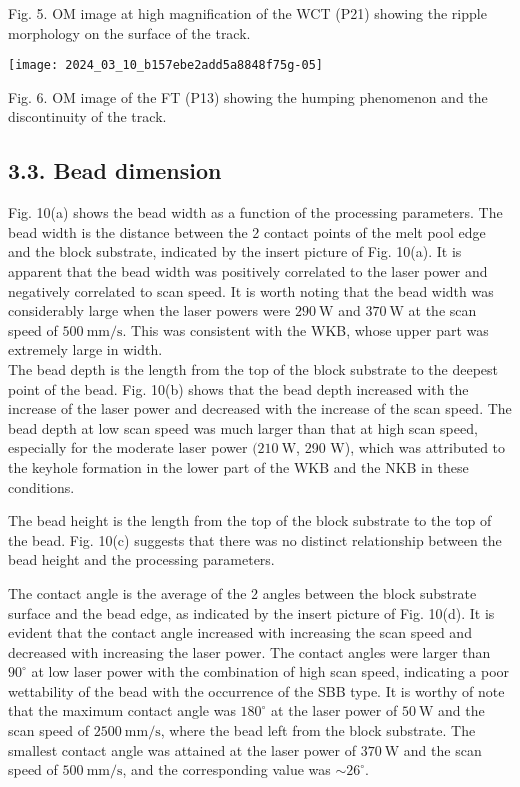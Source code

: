 \documentclass[10pt]{article}
\begin{document}
Fig. 5. OM image at high magnification of the WCT (P21) showing the ripple morphology on the surface of the track.

\begin{center}
\texttt{[image: 2024\_03\_10\_b157ebe2add5a8848f75g-05]}
\end{center}

Fig. 6. OM image of the FT (P13) showing the humping phenomenon and the discontinuity of the track.

\subsection*{3.3. Bead dimension}
Fig. 10(a) shows the bead width as a function of the processing parameters. The bead width is the distance between the 2 contact points of the melt pool edge and the block substrate, indicated by the insert picture of Fig. 10(a). It is apparent that the bead width was positively correlated to the laser power and negatively correlated to scan speed. It is worth noting that the bead width was considerably large when the laser powers were $290 \mathrm{~W}$ and $370 \mathrm{~W}$ at the scan speed of $500 \mathrm{~mm} / \mathrm{s}$. This was consistent with the WKB, whose upper part was extremely large in width.\\
The bead depth is the length from the top of the block substrate to the deepest point of the bead. Fig. 10(b) shows that the bead depth increased with the increase of the laser power and decreased with the increase of the scan speed. The bead depth at low scan speed was much larger than that at high scan speed, especially for the moderate laser power $(210 \mathrm{~W}$, 290 W), which was attributed to the keyhole formation in the lower part of the WKB and the NKB in these conditions.

The bead height is the length from the top of the block substrate to the top of the bead. Fig. 10(c) suggests that there was no distinct relationship between the bead height and the processing parameters.

The contact angle is the average of the 2 angles between the block substrate surface and the bead edge, as indicated by the insert picture of Fig. 10(d). It is evident that the contact angle increased with increasing the scan speed and decreased with increasing the laser power. The contact angles were larger than $90^{\circ}$ at low laser power with the combination of high scan speed, indicating a poor wettability of the bead with the occurrence of the SBB type. It is worthy of note that the maximum contact angle was $180^{\circ}$ at the laser power of $50 \mathrm{~W}$ and the scan speed of $2500 \mathrm{~mm} / \mathrm{s}$, where the bead left from the block substrate. The smallest contact angle was attained at the laser power of $370 \mathrm{~W}$ and the scan speed of $500 \mathrm{~mm} / \mathrm{s}$, and the corresponding value was $\sim 26^{\circ}$.
\end{document}
